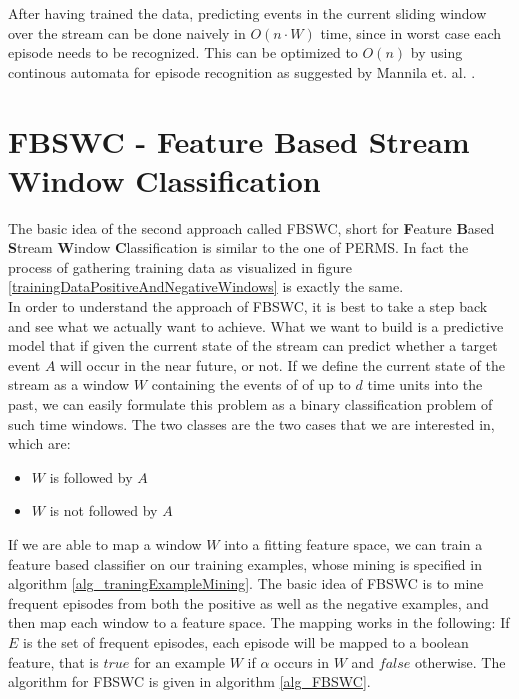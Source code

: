 After having trained the data, predicting events in the current sliding window over the stream can be done naively in $O(n \cdot W)$ time, since in worst case each episode needs to be recognized. This can be optimized to $O(n)$ by using continous automata for episode recognition as suggested by Mannila et. al. \cite{mannila1997discovery}.

\section{FBSWC - Feature Based Stream Window Classification}
\label{sec_FeatureBasedStreamWindowClassification}

The basic idea of the second approach called FBSWC, short for \textbf{F}eature \textbf{B}ased \textbf{S}tream \textbf{W}indow \textbf{C}lassification is similar to the one of PERMS. In fact the process of gathering training data as visualized in figure \ref{trainingDataPositiveAndNegativeWindows} is exactly the same. \\
In order to understand the approach of FBSWC, it is best to take a step back and see what we actually want to achieve. What we want to build is a predictive model that if given the current state of the stream can predict whether a target event $A$ will occur in the near future, or not. If we define the current state of the stream as a window $W$ containing the events of of up to $d$ time units into the past, we can easily formulate this problem as a binary classification problem of such time windows. The two classes are the two cases that we are interested in, which are:

\begin{itemize}
	\item $W$ is followed by $A$
	\item $W$ is not followed by $A$
\end{itemize}

If we are able to map a window $W$ into a fitting feature space, we can train a feature based classifier on our training examples, whose mining is specified in algorithm \ref{alg_traningExampleMining}. The basic idea of FBSWC is to mine frequent episodes from both the positive as well as the negative examples, and then map each window to a feature space. The mapping works in the following: If $E$ is the set of frequent episodes, each episode will be mapped to a boolean feature, that is $true$ for an example $W$ if $\alpha$ occurs in $W$ and $false$ otherwise. The algorithm for FBSWC is given in algorithm \ref{alg_FBSWC}.

